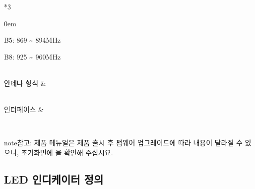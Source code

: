\documentclass[letterpaper,10pt,english]{sphinxmanual}
\begin{document}
\begin{savenotes}
\begin{tabular}[t]{*{3}{}}
\begin{DUlineblock}{0em}
\item[] B5: 869 \textasciitilde{} 894MHz
\item[] B8: 925 \textasciitilde{} 960MHz
\end{DUlineblock}
\\
\sphinxhline
\sphinxAtStartPar
안테나 형식
&%
%
\sphinxstopmulticolumn
\\
\sphinxhline
\sphinxAtStartPar
인터페이스
&%
%
\sphinxstopmulticolumn
\\
\sphinxbottomrule
\end{tabular}
\sphinxtableafterendhook\par
\sphinxattableend\end{savenotes}

\begin{sphinxadmonition}{note}{참고:}
\sphinxAtStartPar
제품 메뉴얼은 제품 출시 후 펌웨어 업그레이드에 따라 내용이 달라질 수 있으니, 초기화면에  을 확인해 주십시요.
\end{sphinxadmonition}


\subsection{LED 인디케이터 정의}
\label{\detokenize{howto/overview:led}}
\end{document}
